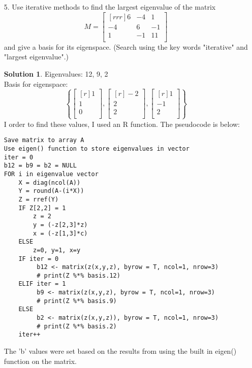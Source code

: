 \documentclass[12pt]{article}
\theoremstyle{definition}
\newtheorem*{solution}{Solution} %
\theoremstyle{plain}
\begin{document}
\begin{enumerate}
\item[5.] Use iterative methods to find the largest eigenvalue of the matrix
\[ M = \begin{bmatrix}[rrr]6&-4&1\\-4&6&-1\\1&-1&11\\\end{bmatrix} \]
and give a basis for its eigenspace. (Search using the key words "iterative" and "largest eigenvalue".)
\begin{solution}
Eigenvalues: 12, 9, 2\\
Basis for eigenspace:  
\[ \left\{ \begin{bmatrix}[r]1\\1\\0\\\end{bmatrix},\begin{bmatrix}[r]-2\\2\\2\\\end{bmatrix},\begin{bmatrix}[r]1\\-1\\2\\\end{bmatrix} \right\} \]
I order to find these values, I used an R function. The pseudocode is below:
\begin{verbatim}
Save matrix to array A
Use eigen() function to store eigenvalues in vector
iter = 0
b12 = b9 = b2 = NULL
FOR i in eigenvalue vector
    X = diag(ncol(A))
    Y = round(A-(i*X))
    Z = rref(Y)
    IF Z[2,2] = 1
	    z = 2
	    y = (-z[2,3]*z)
	    x = (-z[1,3]*c)
    ELSE
        z=0, y=1, x=y
    IF iter = 0
         b12 <- matrix(z(x,y,z), byrow = T, ncol=1, nrow=3)
         # print(Z %*% basis.12)
    ELIF iter = 1
         b9 <- matrix(z(x,y,z), byrow = T, ncol=1, nrow=3)
         # print(Z %*% basis.9)
    ELSE
         b2 <- matrix(z(x,y,z)), byrow = T, ncol=1, nrow=3)
         # print(Z %*% basis.2)
    iter++
\end{verbatim}
The 'b' values were set based on the results from using the built in eigen() function on the matrix.
\end{solution}


\end{enumerate}
\end{document}
